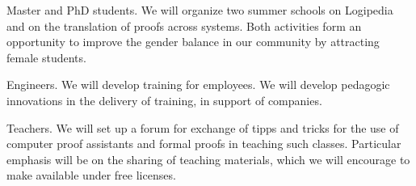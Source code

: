 \begin{workpackage}[id=dissemination,type=MGT,wphases=1-48,
  short={Dissemination},
  title={Dissemination, communication and exploitation},
  lead=Lie,LieRM=1,InrRM=6,BirRM=4,CleRM=2,ImtRM=2,StrRM=2,ZibRM=14,EduRM=12]
\begin{tasklist}
\begin{task}[id=training,
      title=Training Logipedia developers and users,
      shorttitle=Train.,
      lead=Bir,BirRM=2,wphases=1-48!.05]
    \begin{compactitem}
    \item Master and PhD students.
      We will organize two summer schools on Logipedia
      and on the translation of proofs across systems.
      Both activities form an
      opportunity to improve the gender balance in our community by
      attracting female students.
    \item Engineers.
      We will develop training for employees.
      We will develop pedagogic innovations in the delivery of training,
      in support of companies.
    \item Teachers.
      We will set up a forum for exchange of tipps and tricks for the use
      of computer proof assistants and formal proofs in teaching such classes.
      Particular emphasis will be on the sharing of teaching materials, which
      we will encourage to make available under free licenses.
    \end{compactitem}


  \end{task}


\end{tasklist}
\end{workpackage}
